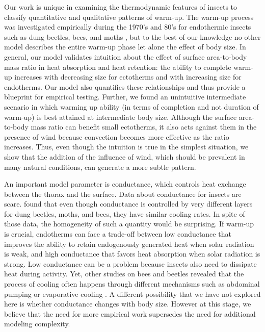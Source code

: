 Our work is unique in examining the thermodynamic features of insects to classify quantitative and qualitative patterns of warm-up. %
The warm-up process was investigated empirically during the 1970's and 80's for endothermic insects  such as dung beetles, bees, and moths \citep{Heinrich1975, Bartholomew1978, Bartholomew1981}, but to the best of our knowledge no other model describes the entire warm-up phase let alone the effect of body size.
In general, our model validates intuition about the effect of surface area-to-body mass ratio in heat absorption and heat retention: the ability to complete warm-up increases with decreasing size for ectotherms and with increasing size for endotherms.
Our model also quantifies these relationships and thus provide a blueprint for empirical testing.
Further, we found an unintuitive intermediate scenario in which warming up ability (in terms of completion and not duration of warm-up) is best attained at intermediate body size.
Although the surface area-to-body mass ratio can benefit small ectotherms, it also acts against them in the presence of wind because convection becomes more effective as the ratio increases.
Thus, even though the intuition is true in the simplest situation, we show that the addition of the influence of wind, which should be prevalent in many natural conditions, can generate a more subtle pattern.

An important model parameter is conductance, which controls heat exchange between the thorax and the surface.
Data about conductance for insects are scare.
\citet{Bartholomew1978} found that even though conductance is controlled by very different layers for dung beetles, moths, and bees, they have similar cooling rates. %
In spite of those data, the homogeneity of such a quantity would be surprising. %
If warm-up is crucial, endotherms can face a trade-off between low conductance that improves the ability to retain endogenously generated heat when solar radiation is weak, and high conductance that favors heat absorption when solar radiation is strong.
Low conductance  can be a problem because insects also need to dissipate heat during activity.
Yet, other studies on bees and beetles revealed that the process of cooling often happens through different mechanisms such as abdominal pumping or evaporative cooling \citep{Heinrich1979, Verdu2012}.
A different possibility that we have not explored here is whether conductance changes with body size.
However at this stage, we believe that the need for more empirical work supersedes the need for additional modeling complexity.

